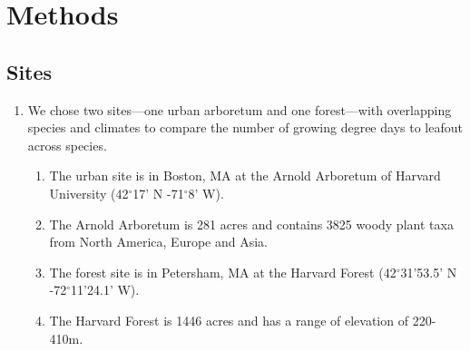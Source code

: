 \documentclass{article}\usepackage[]{graphicx}\usepackage[]{color}
\begin{document}
\section*{Methods}
\subsection*{Sites}
\begin{enumerate}
\item We chose two sites---one urban arboretum and one forest---with overlapping species and climates to compare the number of growing degree days to leafout across species. 
  \begin{enumerate}
  \item The urban site is in Boston, MA at the Arnold Arboretum of Harvard University (42$^{\circ}$17' N -71$^{\circ}$8' W).
  \item The Arnold Arboretum is 281 acres and contains 3825 woody plant taxa from North America, Europe and Asia.
  \item The forest site is in Petersham, MA at the Harvard Forest (42$^{\circ}$31'53.5' N -72$^{\circ}$11'24.1' W).
  \item The Harvard Forest is 1446 acres and has a range of elevation of 220-410m. 
  \end{enumerate}
\end{enumerate}
\end{document}
